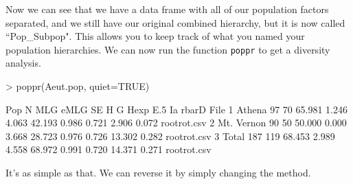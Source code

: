 \documentclass[letterpaper]{article}
\begin{document}
Now we can see that we have a data frame with all of our population factors separated, and we still have our original combined hierarchy, but it is now called ``Pop\_Subpop". This allows you to keep track of what you named your population hierarchies. We can now run the function \texttt{poppr} to get a diversity analysis.
\begin{Schunk}
\begin{Sinput}
> poppr(Aeut.pop, quiet=TRUE)
\end{Sinput}
\begin{Soutput}
         Pop   N MLG   eMLG    SE     H      G  Hexp   E.5     Ia rbarD        File
1     Athena  97  70 65.981 1.246 4.063 42.193 0.986 0.721  2.906 0.072 rootrot.csv
2 Mt. Vernon  90  50 50.000 0.000 3.668 28.723 0.976 0.726 13.302 0.282 rootrot.csv
3      Total 187 119 68.453 2.989 4.558 68.972 0.991 0.720 14.371 0.271 rootrot.csv
\end{Soutput}
\end{Schunk}
It's as simple as that. We can reverse it by simply changing the method.
\begin{center}
\end{center}
\end{document}
